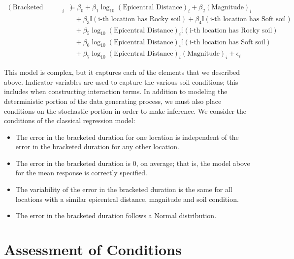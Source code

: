 \documentclass[]{book}
\providecommand{\tightlist}{%
  \setlength{\itemsep}{0pt}\setlength{\parskip}{0pt}}
\theoremstyle{plain}
\theoremstyle{mydefn}
\theoremstyle{myexmpl}
\theoremstyle{remark}
\begin{document}
\begin{equation}
  \begin{aligned}
    (\text{Bracketed Duration})_i &= \beta_0 + \beta_1\log_{10}(\text{Epicentral Distance})_i + \beta_2(\text{Magnitude})_i \\
      &\quad + \beta_3\mathbb{I}(\text{i-th location has Rocky soil}) + \beta_4\mathbb{I}(\text{i-th location has Soft soil}) \\
      &\quad + \beta_5\log_{10}(\text{Epicentral Distance})_i\mathbb{I}(\text{i-th location has Rocky soil}) \\
      &\quad + \beta_6\log_{10}(\text{Epicentral Distance})_i\mathbb{I}(\text{i-th location has Soft soil}) \\
      &\quad + \beta_7\log_{10}(\text{Epicentral Distance})_i(\text{Magnitude})_i + \epsilon_i
  \end{aligned}
  \label{eq:regrecap-model}
\end{equation}

This model is complex, but it captures each of the elements that we
described above. Indicator variables are used to capture the various
soil conditions; this includes when constructing interaction terms. In
addition to modeling the deterministic portion of the data generating
process, we must also place conditions on the stochastic portion in
order to make inference. We consider the conditions of the classical
regression model:

\begin{itemize}
\tightlist
\item
  The error in the bracketed duration for one location is independent of
  the error in the bracketed duration for any other location.
\item
  The error in the bracketed duration is 0, on average; that is, the
  model above for the mean response is correctly specified.
\item
  The variability of the error in the bracketed duration is the same for
  all locations with a similar epicentral distance, magnitude and soil
  condition.
\item
  The error in the bracketed duration follows a Normal distribution.
\end{itemize}

\section{Assessment of Conditions}\label{assessment-of-conditions}
\end{document}
